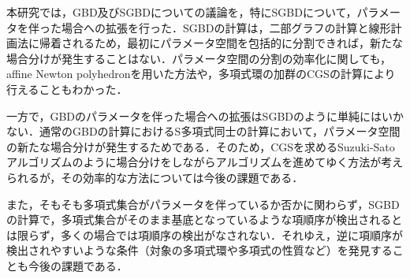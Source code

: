 本研究では，GBD及びSGBDについての議論を，特にSGBDについて，パラメータを伴った場合への拡張を行った．SGBDの計算は，二部グラフの計算と線形計画法に帰着されるため，最初にパラメータ空間を包括的に分割できれば，新たな場合分けが発生することはない．パラメータ空間の分割の効率化に関しても，affine Newton polyhedronを用いた方法や，多項式環の加群のCGSの計算により行えることもわかった．
\par
一方で，GBDのパラメータを伴った場合への拡張はSGBDのように単純にはいかない．通常のGBDの計算におけるS多項式同士の計算において，パラメータ空間の新たな場合分けが発生するためである．そのため，CGSを求めるSuzuki-Satoアルゴリズム\cite{suzuki2003alternative}のように場合分けをしながらアルゴリズムを進めてゆく方法が考えられるが，その効率的な方法については今後の課題である．
\par
また，そもそも多項式集合がパラメータを伴っているか否かに関わらず，SGBDの計算で，多項式集合がそのまま\groebner{}基底となっているような項順序が検出されるとは限らず，多くの場合では項順序の検出がなされない．それゆえ，逆に項順序が検出されやすいような条件（対象の多項式環や多項式の性質など）を発見することも今後の課題である．